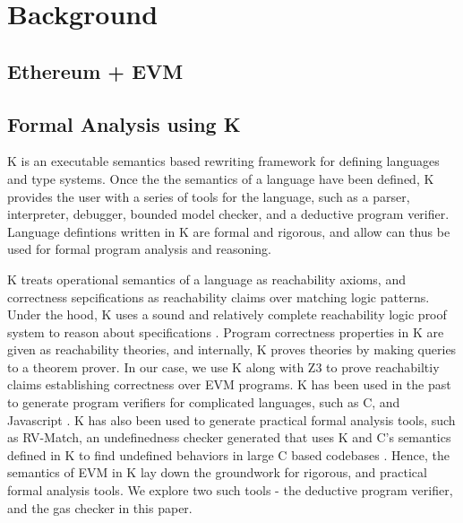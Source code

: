 \section{Background}
\subsection{Ethereum + EVM}
\subsection{Formal Analysis using K}
K is an executable semantics based rewriting framework for defining languages and type systems. Once the the semantics of a language have been defined, K provides the user with a series of tools for the language, such as a parser, interpreter, debugger, bounded model checker, and a deductive program verifier. Language defintions written in K are formal and rigorous, and allow can thus be used for formal program analysis and reasoning.

K treats operational semantics of a language as reachability axioms, and correctness sepcifications as reachability claims over matching logic patterns. Under the hood, K uses a sound and relatively complete reachability logic proof system to reason about specifications \cite{stefanescu-park-yuwen-li-rosu-2016-oopsla} \cite{stefanescu-ciobaca-mereuta-moore-serbanuta-rosu-2014-rta}. Program correctness properties in K are given as reachability theories, and internally, K proves theories by making queries to a theorem prover. In our case, we use K along with Z3 \cite{de2008z3} to prove reachabiltiy claims establishing correctness over EVM programs. K has been used in the past to generate program verifiers for complicated languages, such as C, and Javascript \cite{stefanescu-park-yuwen-li-rosu-2016-oopsla}. K has also been used to generate practical formal analysis tools, such as RV-Match, an undefinedness checker generated that uses K and C's semantics defined in K to find undefined behaviors in large C based codebases \cite{guth-hathhorn-saxena-rosu-2016-cav}. Hence, the semantics of EVM in K lay down the groundwork for rigorous, and practical formal analysis tools. We explore two such tools - the deductive program verifier, and the gas checker in this paper. 

